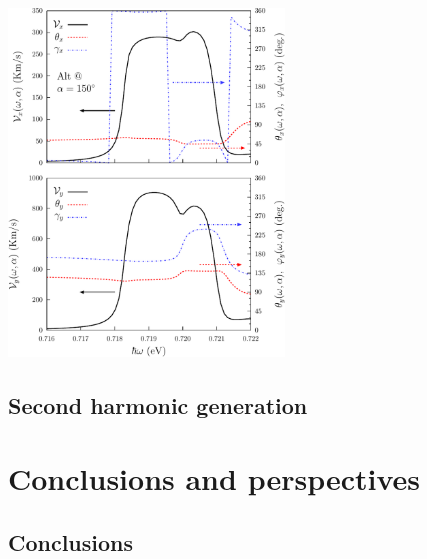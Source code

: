 \documentclass{beamer}
\begin{document}

\begin{frame}

\begin{center}
\includegraphics[width=0.55\textwidth]{figs/fig9.pdf}
\end{center}  

\end{frame}



\subsection{Second harmonic generation}



\section{Conclusions and perspectives} 



\subsection{Conclusions}

\end{document}
